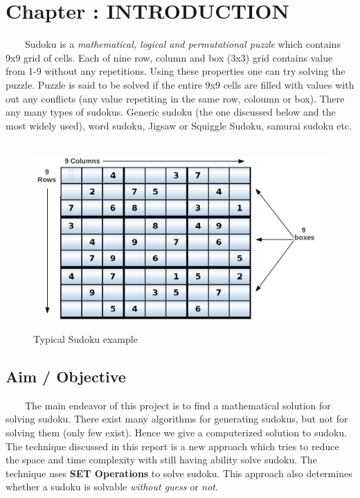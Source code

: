 \documentclass[12pt,a4paper]{article}
\begin{document}
\thispagestyle{empty}
\tableofcontents
\newpage

\section{Chapter : INTRODUCTION}
\onehalfspacing
\ \ \ \ Sudoku ‎is a \textit{mathematical, logical and permutational puzzle} which contains 9x9 grid of cells. Each of nine row, column and box (3x3) grid contains value from 1-9 without any repetitions. Using these properties one can try solving the puzzle. Puzzle is said to be solved if the entire 9x9 cells are filled with values with out any conflicts (any value repetiting in the same row, coloumn or box). There any many types of sudokus. Generic sudoku (the one discussed below and the most widely used), word sudoku, 
Jigsaw or Squiggle Sudoku, samurai sudoku etc. 

\begin{figure}[H]
\begin{center}
\ \newline
\includegraphics[scale=.5]{typicalsudoku.png}
\caption{Typical Sudoku example}
\end{center}
\end{figure}


\subsection{Aim / Objective}
\ \ \ \ The main endeavor of this project is to find a mathematical solution for solving sudoku.  There exist many algorithms for generating sudokus, but not for solving them (only few exist). Hence we give a computerized solution to sudoku. The technique discussed in this report is a new approach which tries to reduce the space and time complexity with still having ability solve sudoku. The technique uses \textbf{SET Operations} to solve sudoku. This approach also determines whether a sudoku is solvable \textit{without guess} or \textit{not}.
\ \newline
\end{document}
